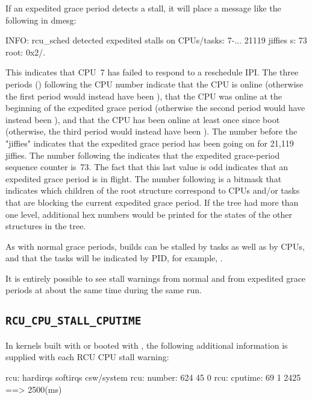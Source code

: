 If an expedited grace period detects a stall, it will place a message
like the following in dmesg:

\begin{VerbatimU}[breaklines=true]
	INFO: rcu_sched detected expedited stalls on CPUs/tasks: { 7-... } 21119 jiffies s: 73 root: 0x2/.
\end{VerbatimU}

This indicates that CPU~7 has failed to respond to a reschedule IPI\@.
The three periods () following the CPU number indicate that the CPU
is online (otherwise the first period would instead have been ),
that the CPU was online at the beginning of the expedited grace period
(otherwise the second period would have instead been ), and that
the CPU has been online at least once since boot (otherwise, the third
period would instead have been ).
The number before the "jiffies"
indicates that the expedited grace period has been going on for 21,119
jiffies.
The number following the  indicates that the expedited
grace-period sequence counter is~73.
The fact that this last value is
odd indicates that an expedited grace period is in flight.
The number
following  is a bitmask that indicates which children of the root
 structure correspond to CPUs and/or tasks that are blocking the
current expedited grace period.
If the tree had more than one level,
additional hex numbers would be printed for the states of the other
 structures in the tree.

As with normal grace periods,  builds can be stalled by
tasks as well as by CPUs, and that the tasks will be indicated by PID,
for example, .

It is entirely possible to see stall warnings from normal and from
expedited grace periods at about the same time during the same run.

\subsection{\texttt{RCU\_CPU\_STALL\_CPUTIME}}

In kernels built with  or booted with
, the following additional information
is supplied with each RCU CPU stall warning:

\begin{VerbatimU}
  rcu:          hardirqs   softirqs   csw/system
  rcu:  number:      624         45            0
  rcu: cputime:       69          1         2425   ==> 2500(ms)
\end{VerbatimU}

